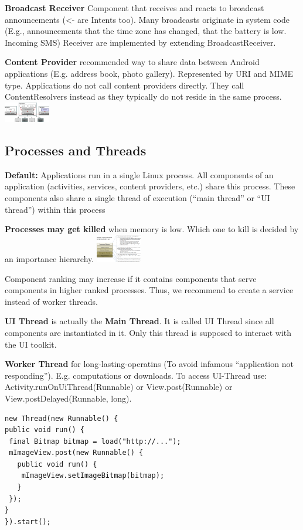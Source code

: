 \textbf{Broadcast Receiver}
Component that receives and reacts to broadcast announcements (<- are Intents too).
Many broadcasts originate in system code (E.g., announcements that the time
zone has changed, that the battery is low. Incoming SMS)
Receiver are implemented by extending BroadcastReceiver.

\textbf{Content Provider}
recommended way to share data between Android applications (E.g. address book,
photo gallery). Represented by URI and MIME type.
Applications do not call content providers directly. They call ContentResolvers
instead as they typically do not reside in the same process.
\includegraphics[width=0.15\textwidth]{android/content_provider.png}

\subsection{Processes and Threads}
\textbf{Default:} Applications run in a single Linux process. All components of
an application (activities, services, content providers, etc.) share this
process. These components also share a single thread of execution (“main
thread” or “UI thread”) within this process

\textbf{Processes may get killed} when memory is low. Which one to kill is
decided by an importance hierarchy.
\includegraphics[width=0.15\textwidth]{android/importance_hierarchy.png}

Component ranking may increase if it contains components that serve components
in higher ranked processes. Thus, we recommend to create a service instead of
worker threads.

\textbf{UI Thread} is actually the \textbf{Main Thread}. It is called UI Thread
since all components are instantiated in it. Only this thread is supposed to
interact with the UI toolkit.

\textbf{Worker Thread} for long-lasting-operatins (To avoid infamous
“application not responding”). E.g. computations or downloads. To access
UI-Thread use: Activity.runOnUiThread(Runnable) or View.post(Runnable) or
View.postDelayed(Runnable, long).

\begin{lstlisting}
new Thread(new Runnable() {
public void run() {
 final Bitmap bitmap = load("http://...");
 mImageView.post(new Runnable() {
   public void run() {
    mImageView.setImageBitmap(bitmap);
   }
 });
}
}).start();
\end{lstlisting}

